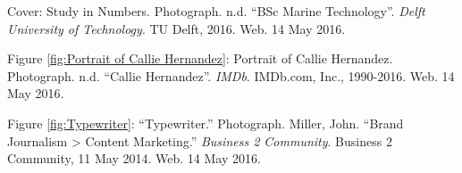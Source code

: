 \newpage 
{}
\begin{imagescited} 
\begin{flushleft}
\linespread{1.5}

Cover: 
\bibent
Study in Numbers. Photograph. n.d. “BSc Marine Technology”. \textit{Delft University of Technology}. TU Delft, 2016. Web. 14 May 2016.

Figure \ref{fig:Portrait of Callie Hernandez}:
\bibent
Portrait of Callie Hernandez. Photograph. n.d. “Callie Hernandez”. \textit{IMDb}. IMDb.com, Inc., 1990-2016. Web. 14 May 2016.

Figure \ref{fig:Typewriter}:
\bibent
“Typewriter.” Photograph. Miller, John. “Brand Journalism > Content Marketing.” \textit{Business 2 Community}. Business 2 Community, 11 May 2014. Web. 14 May 2016. 


\end{flushleft}
\end{imagescited} 